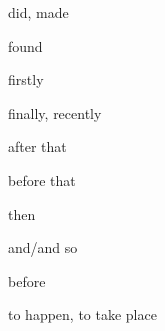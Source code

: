 \documentclass[avery5371,grid,frame]{flashcards}
\begin{document}
\begin{flashcard}{\LARGE did, made}
\LARGE {}
\end{flashcard}
\begin{flashcard}{\LARGE found}
\LARGE {}
\end{flashcard}
\begin{flashcard}{\LARGE firstly}
\LARGE {}
\end{flashcard}
\begin{flashcard}{\LARGE finally, recently}
\LARGE {}
\end{flashcard}
\begin{flashcard}{\LARGE after that}
\LARGE {}
\end{flashcard}
\begin{flashcard}{\LARGE before that}
\LARGE {}
\end{flashcard}
\begin{flashcard}{\LARGE then}
\LARGE {}
\end{flashcard}
\begin{flashcard}{\LARGE and/and so}
\LARGE {}
\end{flashcard}
\begin{flashcard}{\LARGE before}
\LARGE {}
\end{flashcard}
\begin{flashcard}{\LARGE to happen, to take place}
\LARGE {}
\end{flashcard}
\end{document}
